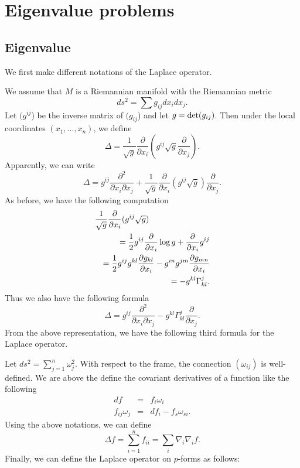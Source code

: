 
\chapter{Eigenvalue problems}\label{Eigenvalue_problem}
\section{Eigenvalue}\label{Eigenvalue}

We first make different notations of the Laplace operator.

We assume that $M$ is a Riemannian manifold with the Riemannian metric 
%
\[ ds^2 = \sum g_{ij} d x _i d x _j .\]
%
Let $ (g^{ij}$) be the inverse matrix of $  (g_{ij}$) and let $ g = {\rm det}  (g_{ij})$. Then under the local coordinates $ (x _1, \ldots, x _n )$, we define
%
\[ \Delta = \frac{1}{\sqrt{g}} \frac{\partial }{\partial x_i} \left( g ^{ij} \sqrt{g} \frac{\partial }{\partial x_j} \right) .\]
%
Apparently, we can write 
%
\[ \Delta =   g^{ij}\frac{\partial^2 }{\partial x_i \partial x _j} +\frac{1}{\sqrt{g} } \frac{\partial }{\partial x_i} \left( g ^{ij} \sqrt{g} \right)\frac{\partial }{\partial x_j}   .  \]
%
As before, we have the following computation 
%
\begin{eqnarray*}
\lefteqn{\frac{1}{\sqrt{g} } \frac{\partial }{\partial x_i}  ( g^{ij} \sqrt{g} )} \\
&& = \frac{1}{2} g^{ij} \frac{\partial}{\partial x_i} \log g + \frac{\partial }{\partial x_i}  g ^{ij} \\
&& = \frac{1}{2} g^{ij}g^{kl}\frac{\partial g _{kl} }{\partial x_i} - g^{in} g^{jm} \frac{\partial g _{mn} }{\partial x_i} \\
&& = - g^{kl} \Gamma ^j _{kl} .
\end{eqnarray*}
Thus we also have the following formula 
%
\[ \Delta = g^{ij}   \frac{\partial^2 }{\partial x_i \partial x _j} - g ^{kl} \Gamma ^j_{kl}  \frac{\partial }{\partial x_j}   .\]
%
From the above representation, we have the following third formula for the Laplace operator.

Let $ ds^2 = \sum^n _{j=1} \omega ^2_j $. With respect to the frame, the connection $ (\omega _{ij} )$ is well-defined. We are above the define the covariant derivatives of a function like the following
%
\begin{eqnarray*}
df & = & f _i \omega _i\\
f_{ij} \omega _j & = & d f _i - f _s \omega _{si}.\end{eqnarray*}
%
Using the above notations, we can define 
%
\[ \Delta f = \sum^n_{i=1} f _{ii} = \sum _i \nabla _i \nabla _i f .\]
%
Finally, we can define the Laplace operator on $p$-forms as follows:


